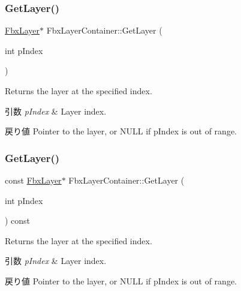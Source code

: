 \mbox{\label{class_fbx_layer_container_a84f58c0498e55ff9123bba6040cccb7a}} 
\subsubsection{\texorpdfstring{Get\+Layer()}{GetLayer()}\hspace{0.1cm}{\footnotesize\ttfamily [1/4]}}
{\footnotesize\ttfamily \hyperlink{class_fbx_layer}{Fbx\+Layer}$\ast$ Fbx\+Layer\+Container\+::\+Get\+Layer (\begin{DoxyParamCaption}\item[{int}]{p\+Index }\end{DoxyParamCaption})}

Returns the layer at the specified index. 
\begin{DoxyParams}{引数}
{\em p\+Index} & Layer index. \\
\hline
\end{DoxyParams}
\begin{DoxyReturn}{戻り値}
Pointer to the layer, or {\ttfamily N\+U\+LL} if p\+Index is out of range. 
\end{DoxyReturn}
\mbox{\label{class_fbx_layer_container_a8c69bb442675cff3f1bc8f2be8511558}} 
\subsubsection{\texorpdfstring{Get\+Layer()}{GetLayer()}\hspace{0.1cm}{\footnotesize\ttfamily [2/4]}}
{\footnotesize\ttfamily const \hyperlink{class_fbx_layer}{Fbx\+Layer}$\ast$ Fbx\+Layer\+Container\+::\+Get\+Layer (\begin{DoxyParamCaption}\item[{int}]{p\+Index }\end{DoxyParamCaption}) const}

Returns the layer at the specified index. 
\begin{DoxyParams}{引数}
{\em p\+Index} & Layer index. \\
\hline
\end{DoxyParams}
\begin{DoxyReturn}{戻り値}
Pointer to the layer, or {\ttfamily N\+U\+LL} if p\+Index is out of range. 
\end{DoxyReturn}
\mbox{\label{class_fbx_layer_container_ae5335d608b3b4e6d44c9221b3c3d2d73}} 

